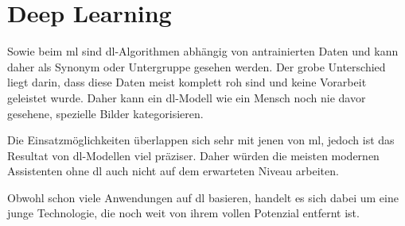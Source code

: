 \section{Deep Learning}

Sowie beim \gls{ml} sind \gls{dl}-Algorithmen abhängig von antrainierten Daten und kann daher als Synonym oder Untergruppe gesehen werden. Der grobe Unterschied liegt darin, dass diese Daten meist komplett roh sind und keine Vorarbeit geleistet wurde. Daher kann ein \gls{dl}-Modell wie ein Mensch noch nie davor gesehene, spezielle Bilder kategorisieren. 

Die Einsatzmöglichkeiten überlappen sich sehr mit jenen von \gls{ml}, jedoch ist das Resultat von \gls{dl}-Modellen viel präziser. Daher würden die meisten modernen Assistenten ohne \gls{dl} auch nicht auf dem erwarteten Niveau arbeiten. 

Obwohl schon viele Anwendungen auf \Gls{dl} basieren, handelt es sich dabei um eine junge Technologie, die noch weit von ihrem vollen Potenzial entfernt ist.

